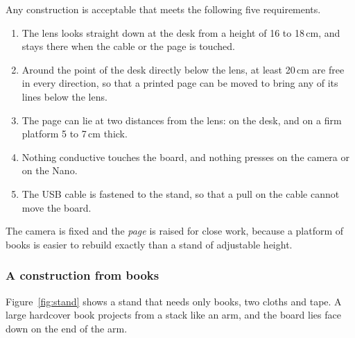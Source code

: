 Any construction is acceptable that meets the following five requirements.
\begin{enumerate}
\item The lens looks straight down at the desk from a height of 16 to 18\,cm, and stays there
  when the cable or the page is touched.
\item Around the point of the desk directly below the lens, at least 20\,cm are free in every
  direction, so that a printed page can be moved to bring any of its lines below the lens.
\item The page can lie at two distances from the lens: on the desk, and on a firm platform 5 to
  7\,cm thick.
\item Nothing conductive touches the board, and nothing presses on the camera or on the Nano.
\item The USB cable is fastened to the stand, so that a pull on the cable cannot move the
  board.
\end{enumerate}
The camera is fixed and the \emph{page} is raised for close work, because a platform of books is
easier to rebuild exactly than a stand of adjustable height.

\subsubsection*{A construction from books}

Figure~\ref{fig:stand} shows a stand that needs only books, two cloths and tape. A large
hardcover book projects from a stack like an arm, and the board lies face down on the end of
the arm.


